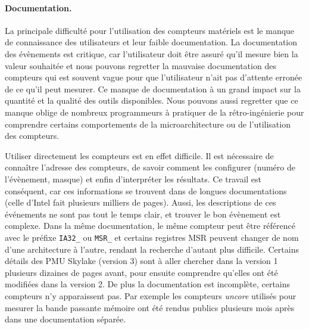         \paragraph{Documentation.}
            La principale difficulté pour l'utilisation des compteurs matériels est le manque de connaissance des utilisateurs et leur faible documentation. La documentation des évènements est critique, car l'utilisateur doit être assuré qu'il mesure bien la valeur souhaitée et nous pouvons regretter la mauvaise documentation des compteurs qui est souvent vague pour que l'utilisateur n'ait pas d'attente erronée de ce qu'il peut mesurer. Ce manque de documentation à un grand impact sur la quantité et la qualité des outils disponibles. Nous pouvons aussi regretter que ce manque oblige de nombreux programmeurs à pratiquer de la rétro-ingénierie pour comprendre certains comportements de la microarchitecture ou de l'utilisation des compteurs.

            Utiliser directement les compteurs est en effet difficile. Il est nécessaire de connaître l'adresse des compteurs, de savoir comment les configurer (numéro de l'évènement, masque) et enfin d'interpréter les résultats. Ce travail est conséquent, car ces informations se trouvent dans de longues documentations (celle d'Intel fait plusieurs milliers de pages). Aussi, les descriptions de ces événements ne sont pas tout le temps clair, et trouver le bon évènement est complexe. Dans la même documentation, le même compteur peut être référencé avec le préfixe \verb=IA32_= ou \verb=MSR_= et certains registres MSR peuvent changer de nom d'une architecture à l'autre, rendant la recherche d'autant plus difficile. Certains détails des PMU Skylake (version 3) sont à aller chercher dans la version 1 plusieurs dizaines de pages avant, pour ensuite comprendre qu'elles ont été modifiées dans la version 2. De plus la documentation est incomplète, certains compteurs n'y apparaissent pas. Par exemple les compteurs \textit{uncore} utilisés pour mesurer la bande passante mémoire ont été rendus publics plusieurs mois après dans une documentation séparée.
      
